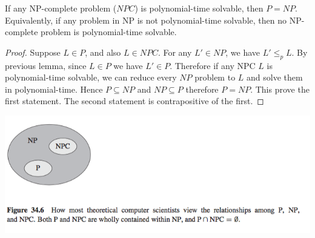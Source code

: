 \documentclass[11pt]{article}
\begin{document}
\begin{theorem*}
    If any NP-complete problem ($NPC$) is polynomial-time solvable, then $P=NP$. Equivalently, if any problem in NP is not polynomial-time solvable, then no NP-complete problem is polynomial-time solvable.
    \begin{proof}
        Suppose $L\in P$, and also $L\in NPC$. For any $L' \in NP$, we have $L' \leq_p L$. By previous lemma, since $L\in P$ we have $L' \in P$. Therefore if any NPC $L$ is polynomial-time solvable, we can reduce every $NP$ problem to $L$ and solve them in polynomial-time. Hence $P\subseteq NP$ and $NP\subseteq P$ therefore $P=NP$. This prove the first statement. The second statement is contrapositive of the first.
    \end{proof}
\end{theorem*}

\includegraphics[width=\textwidth]{npc_venn.png}
\end{document}
